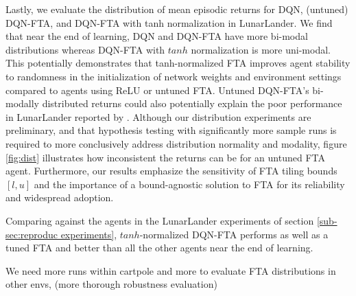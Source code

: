 \documentclass{article}
\begin{document}
Lastly, we evaluate the distribution of mean episodic returns for DQN, (untuned) DQN-FTA, and DQN-FTA with tanh normalization in LunarLander. We find that near the end of learning, DQN and DQN-FTA have more bi-modal distributions whereas DQN-FTA with $tanh$ normalization is more uni-modal. This potentially demonstrates that tanh-normalized FTA improves agent stability to randomness in the initialization of network weights and environment settings compared to agents using ReLU or untuned FTA. Untuned DQN-FTA’s bi-modally distributed returns could also potentially explain the poor performance in LunarLander reported by \cite{pan2019fuzzy}. Although our distribution experiments are preliminary, and that hypothesis testing with significantly more sample runs is required to more conclusively address distribution normality and modality, figure \ref{fig:dist} illustrates how inconsistent the returns can be for an untuned FTA agent. Furthermore, our results emphasize the sensitivity of FTA tiling bounds $[l,u]$ and the importance of a bound-agnostic solution to FTA for its reliability and widespread adoption.

Comparing against the agents in the LunarLander experiments of section \ref{sub-sec:reproduc experiments}, $tanh$-normalized DQN-FTA performs as well as a tuned FTA and better than all the other agents near the end of learning.

We need more runs within cartpole and more to evaluate FTA distributions in other envs, (more thorough robustness evaluation)


\newpage

\end{document}
